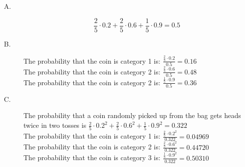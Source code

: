 \documentclass{article}
\begin{document}
\begin{description}
	\item [A.] $$\frac{2}{5}\cdot 0.2+\frac{2}{5}\cdot 0.6+\frac{1}{5}\cdot 0.9=0.5$$
	\item [B.] The probability that the coin is category 1 is: $\frac{\frac{2}{5}\cdot 0.2}{0.5}=0.16$\\
	The probability that the coin is category 2 is: $\frac{\frac{2}{5}\cdot 0.6}{0.5}=0.48$\\
	The probability that the coin is category 2 is: $\frac{\frac{1}{5}\cdot 0.9}{0.5}=0.36$
	\item [C.] The probability that a coin randomly picked up from the bag gets heads twice in two tosses is $\frac{2}{5}\cdot 0.2^2+\frac{2}{5}\cdot 0.6^2+\frac{1}{5}\cdot 0.9^2=0.322$\\
	The probability that the coin is category 1 is: $\frac{\frac{2}{5}\cdot 0.2^2}{0.322}=0.04969$\\
	The probability that the coin is category 2 is: $\frac{\frac{2}{5}\cdot 0.6^2}{0.322}=0.44720$\\
	The probability that the coin is category 3 is: $\frac{\frac{1}{5}\cdot 0.9^2}{0.322}=0.50310$
\end{description}
\end{document}
